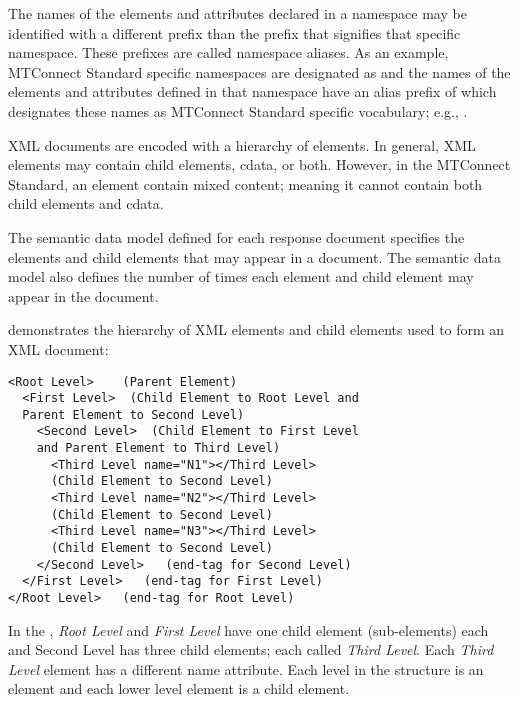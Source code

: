 \begin{itemize}
The names of the elements and attributes declared in a \gls{namespace} may be identified with a different prefix than the prefix that signifies that specific \gls{namespace}.  These prefixes are called \gls{namespace} aliases.  As an example, MTConnect Standard specific \glspl{namespace} are designated as  and the names of the elements and attributes defined in that \gls{namespace} have an alias prefix of  which designates these names as MTConnect Standard specific vocabulary; e.g., . 
\end{itemize}

XML documents are encoded with a hierarchy of elements.  In general, XML elements may contain \glspl{child element}, \gls{cdata}, or both.  However, in the MTConnect Standard, an element \MUSTNOT contain mixed content; meaning it cannot contain both \glspl{child element} and \gls{cdata}. 

The \gls{semantic data model} defined for each \gls{response document} specifies the elements and \glspl{child element} that may appear in a document.  The \gls{semantic data model} also defines the number of times each element and \gls{child element} may appear in the document.

 demonstrates the hierarchy of XML elements and \glspl{child element} used to form an XML document:

\begin{lstlisting}[firstnumber=1,escapechar=|,%
    caption={Example of hierarchy of XML elements}, label={lst:hierarchy-of-xml-elements}]
<Root Level>    (Parent Element)
  <First Level>  (Child Element to Root Level and 
  Parent Element to Second Level)
    <Second Level>  (Child Element to First Level
    and Parent Element to Third Level)
      <Third Level name="N1"></Third Level>  
      (Child Element to Second Level)
      <Third Level name="N2"></Third Level>  
      (Child Element to Second Level)
      <Third Level name="N3"></Third Level>  
      (Child Element to Second Level)
    </Second Level>   (end-tag for Second Level)
  </First Level>   (end-tag for First Level)
</Root Level>   (end-tag for Root Level)
\end{lstlisting}


In the , \textit{Root Level} and \textit{First Level} have one \gls{child element} (sub-elements) each and Second Level has three \glspl{child element}; each called \textit{Third Level}.  Each \textit{Third Level} element has a different name attribute.  Each level in the structure is an element and each lower level element is a \gls{child element}.

